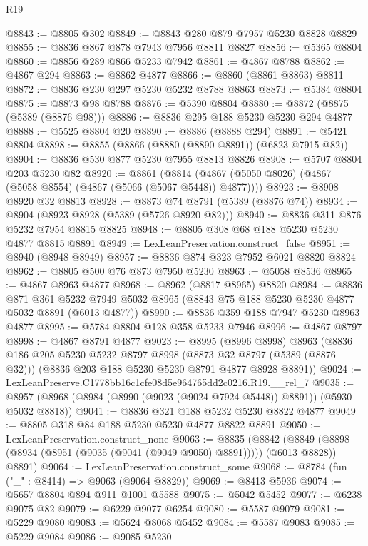 \begin{lexlean}{R19}
\begin{coremodule}
@8843 := @8805 @302
@8849 := @8843 @280 @879 @7957 @5230 @8828 @8829
@8855 := @8836 @867 @878 @7943 @7956 @8811 @8827
@8856 := @5365 @8804
@8860 := @8856 @289 @866 @5233 @7942
@8861 := @4867 @8788
@8862 := @4867 @294
@8863 := @8862 @4877
@8866 := @8860 (@8861 @8863) @8811
@8872 := @8836 @230 @297 @5230 @5232 @8788 @8863
@8873 := @5384 @8804
@8875 := @8873 @98 @8788
@8876 := @5390 @8804
@8880 := @8872 (@8875 (@5389 (@8876 @98)))
@8886 := @8836 @295 @188 @5230 @5230 @294 @4877
@8888 := @5525 @8804 @20
@8890 := @8886 (@8888 @294)
@8891 := @5421 @8804
@8898 := @8855 (@8866 (@8880 (@8890 @8891)) (@6823 @7915 @82))
@8904 := @8836 @530 @877 @5230 @7955 @8813 @8826
@8908 := @5707 @8804 @203 @5230 @82
@8920 := @8861
    (@8814 (@4867 (@5050 @8026) (@4867 (@5058 @8554) (@4867 (@5066 (@5067 @5448)) @4877))))
@8923 := @8908 @8920 @32 @8813
@8928 := @8873 @74 @8791 (@5389 (@8876 @74))
@8934 := @8904 (@8923 @8928 (@5389 (@5726 @8920 @82)))
@8940 := @8836 @311 @876 @5232 @7954 @8815 @8825
@8948 := @8805 @308 @68 @188 @5230 @5230 @4877 @8815 @8891
@8949 := LexLeanPreservation.construct_false
@8951 := @8940 (@8948 @8949)
@8957 := @8836 @874 @323 @7952 @6021 @8820 @8824
@8962 := @8805 @500 @76 @873 @7950 @5230
@8963 := @5058 @8536
@8965 := @4867 @8963 @4877
@8968 := @8962 (@8817 @8965) @8820
@8984 := @8836
    @871
    @361
    @5232
    @7949
    @5032
    @8965
    (@8843 @75 @188 @5230 @5230 @4877 @5032 @8891 (@6013 @4877))
@8990 := @8836 @359 @188 @7947 @5230 @8963 @4877
@8995 := @5784 @8804 @128 @358 @5233 @7946
@8996 := @4867 @8797
@8998 := @4867 @8791 @4877
@9023 := @8995
    (@8996 @8998)
    @8963
    (@8836
      @186
      @205
      @5230
      @5232
      @8797
      @8998
      (@8873 @32 @8797 (@5389 (@8876 @32)))
      (@8836 @203 @188 @5230 @5230 @8791 @4877 @8928 @8891))
@9024 := LexLeanPreserve.C1778bb16c1cfe08d5e964765dd2c0216.R19.__rel_7
@9035 := @8957 (@8968 (@8984 (@8990 (@9023 (@9024 @7924 @5448)) @8891)) (@5930 @5032 @8818))
@9041 := @8836 @321 @188 @5232 @5230 @8822 @4877
@9049 := @8805 @318 @84 @188 @5230 @5230 @4877 @8822 @8891
@9050 := LexLeanPreservation.construct_none
@9063 := @8835
    (@8842 (@8849 (@8898 (@8934 (@8951 (@9035 (@9041 (@9049 @9050) @8891))))) (@6013 @8828)) @8891)
@9064 := LexLeanPreservation.construct_some
@9068 := @8784 (fun ("_" : @8414) => @9063 (@9064 @8829))
@9069 := @8413 @5936
@9074 := @5657 @8804 @894 @911 @1001 @5588
@9075 := @5042 @5452
@9077 := @6238 @9075 @82
@9079 := @6229 @9077 @6254
@9080 := @5587 @9079
@9081 := @5229 @9080
@9083 := @5624 @8068 @5452
@9084 := @5587 @9083
@9085 := @5229 @9084
@9086 := @9085 @5230

\end{coremodule}
\end{lexlean}
